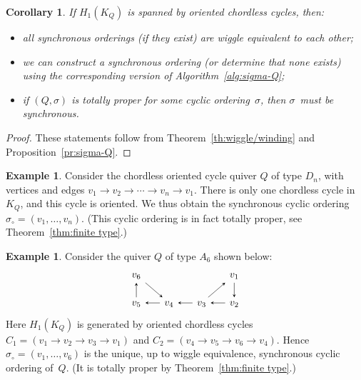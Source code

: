 \documentclass[11pt, letterpaper]{amsart}
\newtheorem{corollary}[theorem]{Corollary}
\theoremstyle{definition}
\newtheorem{example}[theorem]{Example}
\numberwithin{equation}{section}
\newcommand\GQ{K_Q}
\begin{document}
\begin{corollary}
\label{cor:}
If $H_1(\GQ)$ is spanned by oriented chordless cycles, then: 
\begin{itemize}[leftmargin=.2in]
\item 
all synchronous orderings (if they exist) are wiggle equivalent to each other; 
\item
we can construct a synchronous ordering (or determine that none exists) using 
the corresponding version of Algorithm~\ref{alg:sigma-Q}; 
\item
if $(Q,\sigma)$ is totally proper for some cyclic ordering~$\sigma$, then $\sigma$~must be synchronous. 
\end{itemize}
\end{corollary}

\begin{proof}
These statements follow from Theorem~\ref{th:wiggle/winding} and Proposition~\ref{pr:sigma-Q}. 
\end{proof}

\begin{example}
\label{eg:type D totally proper}
Consider the chordless oriented cycle quiver $Q$ of type $D_n$, with vertices and edges 
$v_1 \rightarrow v_2 \rightarrow \cdots \rightarrow v_n \rightarrow v_1$.
There is only one chordless cycle in~$\GQ$, and this cycle is oriented. 
We thus obtain the synchronous cyclic ordering $\sigma_{\circ}= (v_1, \ldots, v_n)$. 
(This cyclic ordering is in fact totally proper, see Theorem~\ref{thm:finite type}.)
%
\end{example}

\begin{example}
Consider the quiver $Q$ of type $A_6$ shown below: %
\begin{equation*}
\begin{tikzcd}[arrows={-stealth}, sep=1.5em]
  v_6  \arrow[rd]   &&& v_1 \arrow[d] \\
v_5 \arrow[u] & v_4 \arrow[l] & v_3 \arrow[ru] \arrow[l] & v_2 \arrow[l] 
\end{tikzcd}
\end{equation*}
Here  $H_1(\GQ)$ is generated by oriented chordless cycles 
$C_1 = (v_1\rightarrow v_2 \rightarrow v_3 \rightarrow v_1)$ and %
$C_2 = (v_4 \rightarrow v_5 \rightarrow v_6 \rightarrow v_4)$.
Hence $\sigma_{\circ}= (v_1, \ldots, v_6)$ is the unique, up to wiggle equivalence, synchronous cyclic ordering of~$Q$.
(It is totally proper by Theorem~\ref{thm:finite type}.)
\end{example}
\end{document}
